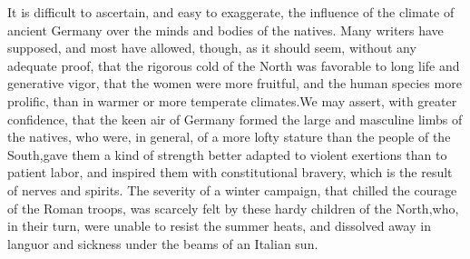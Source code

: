 It is difficult to ascertain, and easy to exaggerate, the
influence of the climate of ancient Germany over the minds and
bodies of the natives. Many writers have supposed, and most have
allowed, though, as it should seem, without any adequate proof,
that the rigorous cold of the North was favorable to long life
and generative vigor, that the women were more fruitful, and the
human species more prolific, than in warmer or more temperate
climates.\footnotemark[8] We may assert, with greater confidence, that the keen
air of Germany formed the large and masculine limbs of the
natives, who were, in general, of a more lofty stature than the
people of the South,\footnotemark[9] gave them a kind of strength better
adapted to violent exertions than to patient labor, and inspired
them with constitutional bravery, which is the result of nerves
and spirits. The severity of a winter campaign, that chilled the
courage of the Roman troops, was scarcely felt by these hardy
children of the North,\footnotemark[10] who, in their turn, were unable to
resist the summer heats, and dissolved away in languor and
sickness under the beams of an Italian sun.\footnotemark[11]





